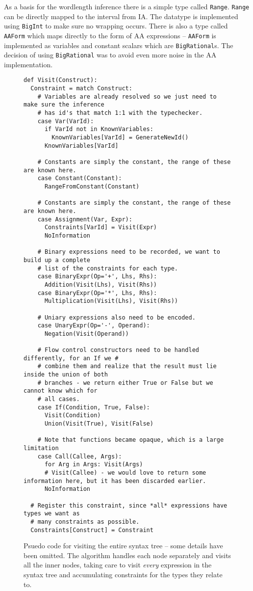 As a basis for the wordlength inference there is a simple type called \verb+Range+. \verb+Range+ can be directly mapped to the interval from IA. The datatype is implemented using \verb+BigInt+ to make sure no wrapping occurs. There is also a type called \verb+AAForm+ which maps directly to the form of AA expressions -- \verb+AAForm+ is implemented as variables and constant scalars which are \verb+BigRational+s. The decision of using \verb+BigRational+ was to avoid even more noise in the AA implementation.


\begin{figure}
\begin{verbatim}
def Visit(Construct):
  Constraint = match Construct:
    # Variables are already resolved so we just need to make sure the inference
    # has id's that match 1:1 with the typechecker.
    case Var(VarId):
      if VarId not in KnownVariables:
        KnownVariables[VarId] = GenerateNewId()
      KnownVariables[VarId]

    # Constants are simply the constant, the range of these are known here.
    case Constant(Constant):
      RangeFromConstant(Constant)

    # Constants are simply the constant, the range of these are known here.
    case Assignment(Var, Expr):
      Constraints[VarId] = Visit(Expr)
      NoInformation

    # Binary expressions need to be recorded, we want to build up a complete
    # list of the constraints for each type.
    case BinaryExpr(Op='+', Lhs, Rhs):
      Addition(Visit(Lhs), Visit(Rhs))
    case BinaryExpr(Op='*', Lhs, Rhs):
      Multiplication(Visit(Lhs), Visit(Rhs))

    # Uniary expressions also need to be encoded.
    case UnaryExpr(Op='-', Operand):
      Negation(Visit(Operand))

    # Flow control constructors need to be handled differently, for an If we #
    # combine them and realize that the result must lie inside the union of both
    # branches - we return either True or False but we cannot know which for
    # all cases.
    case If(Condition, True, False):
      Visit(Condition)
      Union(Visit(True), Visit(False)

    # Note that functions became opaque, which is a large limitation
    case Call(Callee, Args):
      for Arg in Args: Visit(Args)
      # Visit(Callee) - we would love to return some information here, but it has been discarded earlier.
      NoInformation

  # Register this constraint, since *all* expressions have types we want as
  # many constraints as possible.
  Constraints[Construct] = Constraint
\end{verbatim}
  \caption{Psuedo code for visiting the entire syntax tree -- some details have been omitted. The algorithm handles each node separately and visits all the inner nodes, taking care to visit \textit{every} expression in the syntax tree and accumulating constraints for the types they relate to.}
\label{fig:AstWalker}
\end{figure}


